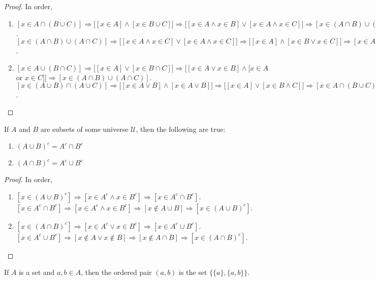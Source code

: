 \documentclass[crop=false,class=book,oneside]{standalone}
\begin{document}
            \begin{proof}
            In order,
            \begin{enumerate}
            \item $[x\in A\cap (B\cup C)]\Rightarrow \big[[x\in A] \land [x\in B\cup C]\big]\Rightarrow \big[[x\in A\land x\in B]\lor [x\in A\land x\in C]\big]\Rightarrow [x\in (A\cap B)\cup (A\cap C)]$. $[x\in (A\cap B)\cup(A\cap C)]\Rightarrow \big[[x\in A\land x\in C]\lor [x\in A \land x\in C]\big]\Rightarrow \big[[x\in A]\land [x\in B\lor x\in C]\big]\Rightarrow [x\in A\cap(B\cup C)]$.
            \item $[x\in A\cup (B\cap C)]\Rightarrow \big[[x\in A]\lor [x\in B\cap C]\big] \Rightarrow \big[[x\in A \lor x\in B]\land [x\in A$ or $x\in C]\big]\Rightarrow [x\in (A\cap B)\cup (A\cap C)]$. $[x\in (A\cup B)\cap (A\cup C)]\Rightarrow \big[[x\in A\lor B]\land [x\in A\lor B]\big]\Rightarrow \big[[x\in A]\lor[x\in B\land C]\big]\Rightarrow [x\in A\cap(B\cup C)]$.
            \end{enumerate}
            \end{proof}
            \begin{theorem}
            If $A$ and $B$ are subsets of some universe $\mathcal{U}$, then the following are true:
            \begin{enumerate}
            \item $(A\cup B)^c = A^c \cap B^c$
            \item $(A\cap B)^c = A^c \cup B^c$
            \end{enumerate}
            \end{theorem}
            \begin{proof}
            In order,
            \begin{enumerate}
            \item $[x\in (A\cup B)^c]\Rightarrow [x\in A^c\land x\in B^c]\Rightarrow [x\in A^c\cap B^c]$. $[x\in A^c \cap B^c]\Rightarrow [x\in A^c\land x\in B^c]\Rightarrow [x\notin A\cup B]\Rightarrow [x\in (A\cup B)^c]$.
            \item $[x\in (A\cap B)^c]\Rightarrow [x\in A^c\lor x\in B^c]\Rightarrow [x\in A^c \cup B^c]$. $[x\in A^c \cup B^c]\Rightarrow [x\notin A\lor x\notin B]\Rightarrow [x\notin A\cap B]\Rightarrow [x\in (A\cap B)^c]$.
            \end{enumerate}
            \end{proof}
            \begin{definition}
            If $A$ is a set and $a,b\in A$, then the ordered pair $(a,b)$ is the set $\{\{a\},\{a,b\}\}$.
            \end{definition}
\end{document}
